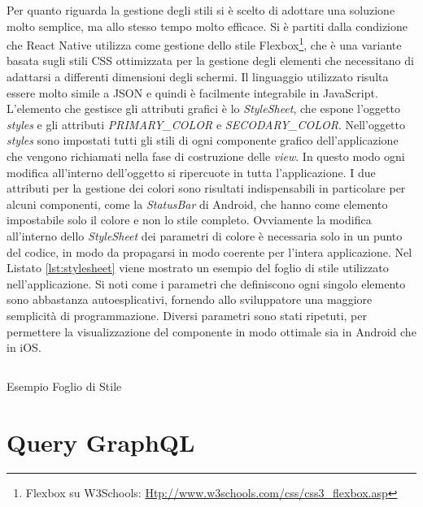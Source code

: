 Per quanto riguarda la gestione degli stili si è scelto di adottare una soluzione molto semplice, ma allo stesso tempo molto efficace. Si è partiti dalla condizione che React Native utilizza come gestione dello stile Flexbox\footnote{Flexbox su W3Schools: \url{Htp://www.w3schools.com/css/css3_flexbox.asp}}, che è una variante basata sugli stili CSS ottimizzata per la gestione degli elementi che necessitano di adattarsi a differenti dimensioni degli schermi. Il linguaggio utilizzato risulta essere molto simile a JSON e quindi è facilmente integrabile in JavaScript. L'elemento che gestisce gli attributi grafici è lo \emph{StyleSheet}, che espone l'oggetto \emph{styles} e gli attributi \emph{PRIMARY\_COLOR} e \emph{SECODARY\_COLOR}.
Nell'oggetto \emph{styles} sono impostati tutti gli stili di ogni componente grafico dell'applicazione che vengono richiamati nella fase di costruzione delle \emph{view}. In questo modo ogni modifica all'interno dell'oggetto si ripercuote in tutta l'applicazione.
I due attributi per la gestione dei colori sono risultati indispensabili in particolare per alcuni componenti, come la \emph{StatusBar} di Android, che hanno come elemento impostabile solo il colore e non lo stile completo. Ovviamente la modifica all'interno dello \emph{StyleSheet} dei parametri di colore è necessaria solo in un punto del codice, in modo da propagarsi in modo coerente per l'intera applicazione.
Nel Listato \ref{lst:stylesheet} viene mostrato un esempio del foglio di stile utilizzato nell'applicazione. Si noti come i parametri che definiscono ogni singolo elemento sono abbastanza autoesplicativi, fornendo allo sviluppatore una maggiore semplicità di programmazione. Diversi parametri sono stati ripetuti, per permettere la visualizzazione del componente in modo ottimale sia in Android che in iOS.

\begin{listing}[h]
	\inputminted{js}{6-implementazione-app/Codice/stylesheet.js}
	\caption{Esempio Foglio di Stile}
	\label{lst:stylesheet}
\end{listing}

\section{Query GraphQL}\label{sec:utilizzo-dati-app}

